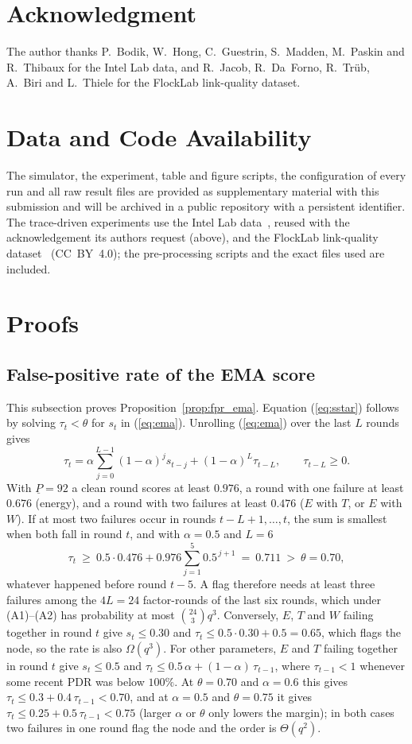 \documentclass{ieeeaccess}
\begin{document}
\section*{Acknowledgment}
The author thanks P.~Bodik, W.~Hong, C.~Guestrin, S.~Madden,
M.~Paskin and R.~Thibaux for the Intel Lab data, and R.~Jacob,
R.~Da~Forno, R.~Tr{\"u}b, A.~Biri and L.~Thiele for the FlockLab
link-quality dataset.

\section*{Data and Code Availability}
The simulator, the experiment, table and figure scripts, the
configuration of every run and all raw result files are provided as
supplementary material with this submission and will be archived in a
public repository with a persistent identifier.  The trace-driven
experiments use the Intel Lab data~\cite{bodik2004intel}, reused with
the acknowledgement its authors request (above), and the FlockLab link-quality
dataset~\cite{jacob2019flocklab} (CC~BY~4.0); the pre-processing scripts
and the exact files used are included.

\appendices
\section{Proofs}
\label{app:proofs}

\subsection{False-positive rate of the EMA score}
This subsection proves Proposition~\ref{prop:fpr_ema}.
Equation (\ref{eq:sstar}) follows by solving $\tau_t<\theta$ for $s_t$
in (\ref{eq:ema}).  Unrolling (\ref{eq:ema}) over the last $L$ rounds
gives
\[
\tau_t=\alpha\sum_{j=0}^{L-1}(1-\alpha)^{j}s_{t-j}+(1-\alpha)^{L}\tau_{t-L},
\qquad \tau_{t-L}\ge 0 .
\]
With $\underline P=92$ a clean round scores at least $0.976$, a round
with one failure at least $0.676$ (energy), and a round with two
failures at least $0.476$ ($E$ with $T$, or $E$ with $W$).  If at most
two failures occur in rounds $t-L+1,\dots,t$, the sum is smallest when
both fall in round $t$, and with $\alpha=0.5$ and $L=6$
\[
\tau_t\ \ge\ 0.5\cdot0.476+0.976\sum_{j=1}^{5}0.5^{\,j+1}
\ =\ 0.711\ >\ \theta=0.70,
\]
whatever happened before round $t-5$.  A flag therefore needs at
least three failures among the $4L=24$ factor-rounds of the last six
rounds, which under (A1)--(A2) has probability at most
$\binom{24}{3}q^{3}$.  Conversely, $E$, $T$ and $W$ failing together
in round $t$ give $s_t\le0.30$ and $\tau_t\le0.5\cdot0.30+0.5=0.65$,
which flags the node, so the rate is also $\Omega(q^{3})$.
For other parameters, $E$ and $T$ failing together in round $t$ give
$s_t\le0.5$ and $\tau_t\le0.5\,\alpha+(1-\alpha)\,\tau_{t-1}$, where
$\tau_{t-1}<1$ whenever some recent PDR was below $100\%$.  At
$\theta=0.70$ and $\alpha=0.6$ this gives $\tau_t\le0.3+0.4\,\tau_{t-1}<0.70$,
and at $\alpha=0.5$ and $\theta=0.75$ it gives
$\tau_t\le0.25+0.5\,\tau_{t-1}<0.75$ (larger $\alpha$ or $\theta$ only
lowers the margin); in both cases two failures in one round flag the
node and the order is $\Theta(q^{2})$.
\end{document}
